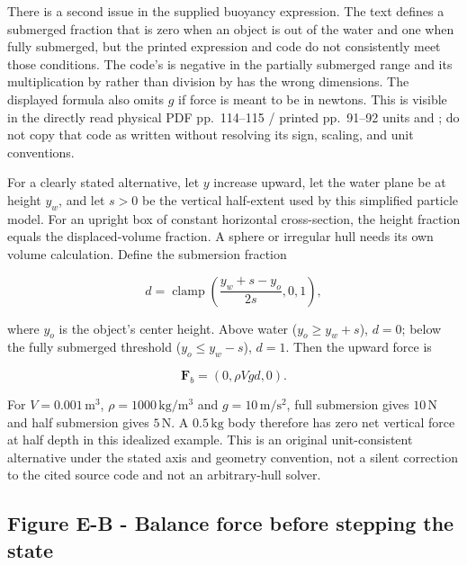 There is a second issue in the supplied buoyancy expression. The text defines a submerged fraction that is zero when an object is out of the water and one when fully submerged, but the printed expression and code do not consistently meet those conditions. The code's  is negative in the partially submerged range and its multiplication by  rather than division by  has the wrong dimensions. The displayed formula also omits \(g\) if force is meant to be in newtons. This is visible in the directly read physical PDF pp.~114--115 / printed pp.~91--92 units  and ; do not copy that code as written without resolving its sign, scaling, and unit conventions.

For a clearly stated alternative, let \(y\) increase upward, let the water plane be at height \(y_w\), and let \(s>0\) be the vertical half-extent used by this simplified particle model. For an upright box of constant horizontal cross-section, the height fraction equals the displaced-volume fraction. A sphere or irregular hull needs its own volume calculation. Define the submersion fraction

\[
d=\operatorname{clamp}\!\left(\frac{y_w+s-y_o}{2s},0,1\right),
\]

where \(y_o\) is the object's center height. Above water (\(y_o\ge y_w+s\)), \(d=0\); below the fully submerged threshold (\(y_o\le y_w-s\)), \(d=1\). Then the upward force is

\[
\mathbf F_b=(0,\rho V g d,0).
\]

For \(V=0.001\,\mathrm{m^3}\), \(\rho=1000\,\mathrm{kg/m^3}\) and \(g=10\,\mathrm{m/s^2}\), full submersion gives \(10\,\mathrm{N}\) and half submersion gives \(5\,\mathrm{N}\). A \(0.5\,\mathrm{kg}\) body therefore has zero net vertical force at half depth in this idealized example. This is an original unit-consistent alternative under the stated axis and geometry convention, not a silent correction to the cited source code and not an arbitrary-hull solver.

\subsection{Figure E-B - Balance force before stepping the state}\label{06-engine-ii-ch047-figure-e-b---balance-force-before-stepping-the-state}

\hypertarget{06-engine-ii-ch047-figure-e-b---balance-force-before-stepping-the-state}{}

